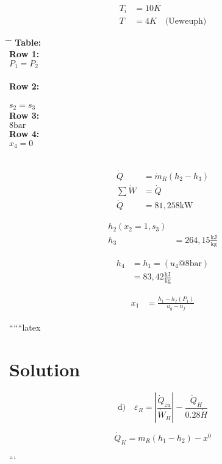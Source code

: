 \begin{align*}
    T_i &= 10K \\
    T &= 4K \quad \text{(Ueweuph)}
\end{align*}

\begin{tabbing}
    \hspace{2cm} \= \hspace{2cm} \= \kill
    \textbf{Table:} \\
    \> \textbf{Row 1:} \\
    \> \> $P_1 = P_2$ \\
    \> \>  \\
    \> \textbf{Row 2:} \\
    \> \>  \\
    \> \> $s_2 = s_3$ \quad {} \\
    \> \textbf{Row 3:} \\
    \> \> $8 \text{bar}$ \\
    \> \textbf{Row 4:} \\
    \> \> $x_4 = 0$ \\
    \> \>  \\
\end{tabbing}

\begin{align*}
    \dot{Q} &= \dot{m}_R (h_2 - h_3) \\
    \sum \dot{W} &= \dot{Q} \\
    \dot{Q} &= 81,258 \text{kW}
\end{align*}

\begin{align*}
    h_2 (x_2 = 1, s_3) \\
    h_3 &= 264,15 \frac{\text{kJ}}{\text{kg}}
\end{align*}

\begin{align*}
    h_4 &= h_1 = (u_4 @ 8 \text{bar}) \\
    &= 83,42 \frac{\text{kJ}}{\text{kg}}
\end{align*}

\begin{align*}
    x_1 &= \frac{h_1 - h_f (P_1)}{u_g - u_f}
\end{align*}

``````latex

\section*{Solution}

\begin{equation*}
\text{d)} \quad \varepsilon_R = \left| \frac{\dot{Q}_{zu}}{\dot{W}_H} \right| - \frac{\dot{Q}_H}{0.28 \dot{H}}
\end{equation*}

\begin{equation*}
\dot{Q}_K = \dot{m}_R (h_1 - h_2) - x^0
\end{equation*}

```